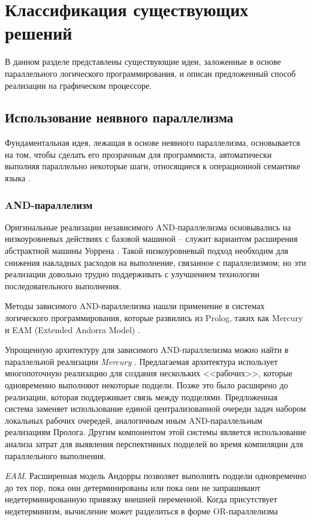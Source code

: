 \chapter{Классификация существующих решений}
В данном разделе представлены существующие идеи, заложенные в основе параллельного логического программирования, и описан предложенный способ реализации на графическом процессоре.

\section{Использование неявного параллелизма}
Фундаментальная идея, лежащая в основе неявного параллелизма, основывается на том, чтобы сделать его прозрачным для программиста, автоматически выполняя параллельно некоторые шаги, относящиеся к операционной семантике языка \cite{parallel_logic}.

\subsection{AND-параллелизм}
Оригинальные реализации независимого AND-параллелизма основывались на низкоуровневых действиях с базовой машиной -- служит вариантом расширения абстрактной машины Уоррена \cite{warren}. Такой низкоуровневый подход необходим для снижения накладных расходов на выполнение, связанное с параллелизмом; но эти реализации довольно трудно поддерживать с улучшением технологии последовательного выполнения.

Методы зависимого AND-параллелизма нашли применение в системах логического программирования, которые развились из Prolog, таких как Mercury  \cite{mercury} и EAM (Extended Andorra Model) \cite{eam}.

Упрощенную архитектуру для зависимого AND-параллелизма можно найти в параллельной реализации \textit{Mercury} \cite{mercury_new}. Предлагаемая архитектура использует многопоточную реализацию для создания нескольких <<рабочих>>, которые одновременно выполняют некоторые подцели. Позже это было расширено до реализации, которая поддерживает связь между подцелями. Предложенная система заменяет использование единой централизованной очереди задач набором локальных рабочих очередей, аналогичным иным AND-параллельным реализациям Пролога. Другим компонентом этой системы является использование анализа затрат для выявления перспективных подцелей во время компиляции для параллельного выполнения.

\textit{EAM}. Расширенная модель Андорры позволяет выполнять подцели одновременно до тех пор, пока они детерминированы или пока они не запрашивают недетерминированную привязку внешней переменной. Когда присутствует недетерминизм, вычисление может разделиться в форме OR-параллелизма


